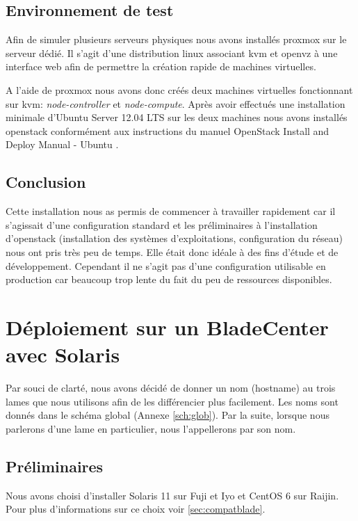 \documentclass[a4paper,oneside]{report}
\begin{document}
\subsection{Environnement de test}
Afin de simuler plusieurs serveurs physiques nous avons installés \gls{proxmox} sur le serveur dédié. Il s'agit d'une distribution \gls{linux} associant \gls{kvm} et \gls{openvz} à une interface web afin de permettre la création rapide de machines virtuelles.

A l'aide de \gls{proxmox} nous avons donc créés deux machines virtuelles fonctionnant sur \gls{kvm}: \emph{node-controller} et \emph{node-compute}. Après avoir effectués une installation minimale d'Ubuntu Server 12.04 LTS sur les deux machines nous avons installés \gls{openstack} conformément aux instructions du manuel \og OpenStack Install and Deploy Manual - Ubuntu \fg \cite{OSFolsomInstallUbuntu1210}.

\subsection{Conclusion}
Cette installation nous as permis de commencer à travailler rapidement car il s'agissait d'une configuration standard et les préliminaires à l'installation d'\gls{openstack} (installation des systèmes d'exploitations, configuration du réseau) nous ont pris très peu de temps.
Elle était donc idéale à des fins d'étude et de développement.\newline
Cependant il ne s'agit pas d'une configuration utilisable en production car beaucoup trop lente du fait du peu de ressources disponibles.

\section{Déploiement sur un BladeCenter avec Solaris} \label{sec:depsolaris}

Par souci de clarté, nous avons décidé de donner un nom (hostname) au trois lames que nous utilisons afin de les différencier plus facilement.
Les noms sont donnés dans le schéma global (Annexe \ref{sch:glob}).
Par la suite, lorsque nous parlerons d'une lame en particulier, nous l'appellerons par son nom.

\subsection{Préliminaires}
Nous avons choisi d'installer Solaris 11 sur Fuji et Iyo et CentOS 6 sur Raijin.
Pour plus d'informations sur ce choix voir \ref{sec:compatblade}.
\end{document}
